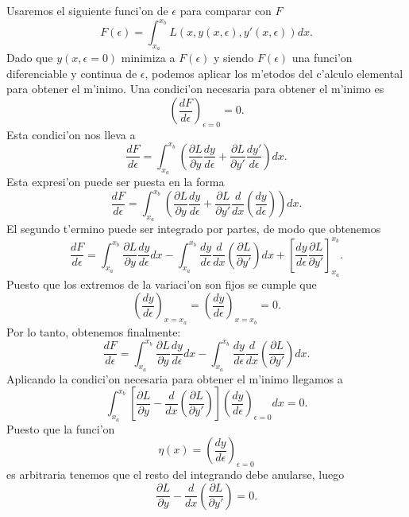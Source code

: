 Usaremos el siguiente funci'on de $\epsilon$ para comparar con $F$
\begin{equation}
F(\epsilon)=\int_{x_a}^{x_b} L(x,y(x,\epsilon),y'(x,\epsilon))dx.
\end{equation}
Dado que $y(x,\epsilon=0)$ minimiza a $F(\epsilon)$ y siendo $F(\epsilon)$ una
funci'on diferenciable y continua de $\epsilon$, podemos aplicar los m'etodos del
c'alculo elemental para obtener el m'inimo. Una condici'on necesaria para obtener
el m'inimo es
\begin{equation}
\left( \frac{dF}{d\epsilon}\right)_{\epsilon=0}=0. 
\end{equation}
Esta condici'on nos lleva a
\begin{equation}
\frac{dF}{d\epsilon}=\int_{x_a}^{x_b} 
\left( 
\frac{\partial L}{\partial y}\frac{dy}{d\epsilon}+
\frac{\partial L}{\partial y'}\frac{dy'}{d\epsilon}
\right)dx. 
\end{equation}
Esta expresi'on puede ser puesta en la forma
\begin{equation}
\frac{dF}{d\epsilon}=\int_{x_a}^{x_b} 
\left( 
\frac{\partial L}{\partial y}\frac{dy}{d\epsilon}+
\frac{\partial L}{\partial y'}\frac{d}{dx}\left( \frac{dy}{d\epsilon}\right)
\right)dx. 
\end{equation}
El segundo t'ermino puede ser integrado por partes, de modo que obtenemos
\begin{equation}
\frac{dF}{d\epsilon}=\int_{x_a}^{x_b}  
\frac{\partial L}{\partial y}\frac{dy}{d\epsilon}dx
-
\int_{x_a}^{x_b}\frac{dy}{d\epsilon}\frac{d}{dx}\left( \frac{\partial L}{
\partial y'}\right)dx
+
\left[ 
\frac{dy}{d\epsilon}\frac{\partial L}{\partial y'}
\right]_{x_a}^{x_b}.  
\end{equation}
Puesto que los extremos de la variaci'on son fijos se cumple que 
\begin{equation}
\left( \frac{dy}{d\epsilon}\right)_{x=x_a}=\left(
\frac{dy}{d\epsilon}\right)_{x=x_b}=0.
\end{equation}
Por lo tanto, obtenemos finalmente:
\begin{equation}
\frac{dF}{d\epsilon}=\int_{x_a}^{x_b}  
\frac{\partial L}{\partial y}\frac{dy}{d\epsilon}dx
-
\int_{x_a}^{x_b}\frac{dy}{d\epsilon}\frac{d}{dx}\left( \frac{\partial L}{
\partial y'}\right)dx.
\end{equation}
Aplicando la condici'on necesaria para obtener el m'inimo llegamos a
\begin{equation}
\int_{x_a}^{x_b} \left[  
\frac{\partial L}{\partial y}
-
\frac{d}{dx}\left( \frac{\partial L}{ \partial y'}\right)\right] 
\left( \frac{dy}{d\epsilon}\right)_{\epsilon=0} 
dx=0.
\end{equation}
Puesto que la funci'on
\begin{equation}
\eta(x)=\left( \frac{dy}{d\epsilon}\right)_{\epsilon=0}
\end{equation}
es arbitraria tenemos que el resto del integrando debe anularse, luego
\begin{equation}
\frac{\partial L}{\partial y}
-
\frac{d}{dx}\left( \frac{\partial L}{ \partial y'}\right)=0.
\end{equation}
